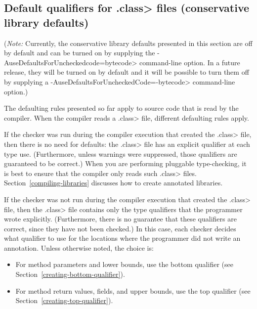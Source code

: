 \subsection{Default qualifiers for \<.class> files (conservative library defaults)\label{defaults-classfile}}

(\emph{Note:} Currently, the conservative library defaults presented in this section
are off by default and can be turned on by supplying the \<-AuseDefaultsForUncheckedcode=bytecode>
command-line option.  In a future release, they will be turned on
by default and it will be possible to turn them off by supplying a
\<-AuseDefaultsForUncheckedCode=-bytecode> command-line option.)

The defaulting rules presented so far apply to source code that is read by
the compiler.  When the compiler reads a \<.class> file, different
defaulting rules apply.

If the checker was run during the compiler execution that created the
\<.class> file,
then there is no need for
defaults:  the \<.class> file has an explicit qualifier at each type use.
(Furthermore, unless warnings were suppressed, those qualifiers are
guaranteed to be correct.)
When you are performing pluggable type-checking,
it is best to ensure that the compiler only reads such \<.class> files.
Section~\ref{compiling-libraries} discusses how to create annotated
libraries.

If the checker was not run during the compiler execution that created the
\<.class> file, then the \<.class> file contains only the type qualifiers
that the programmer wrote explicitly.  (Furthermore, there is no guarantee
that these qualifiers are correct, since they have not been checked.)
In this case, each checker decides what qualifier to use for the
locations where the programmer did not write an annotation.  Unless otherwise noted, the
choice is:

\begin{itemize}
\item
  For method parameters and lower bounds, use the bottom qualifier (see
  Section~\ref{creating-bottom-qualifier}).
\item
  For method return values, fields, and upper bounds, use the top qualifier (see
  Section~\ref{creating-top-qualifier}).
\end{itemize}

